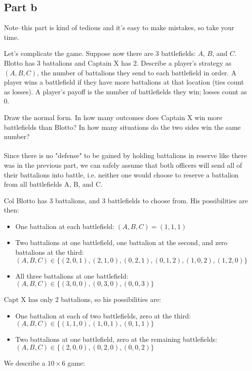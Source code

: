 \documentclass[10pt]{article}
\begin{document}
\subsection*{Part b} Note--this part is kind of tedious and it's easy to make mistakes, so take your time.

Let's complicate the game. Suppose now there are 3 battlefields: $A$, $B$, and $C$. Blotto has 3 battalions and Captain X has 2. Describe a player's strategy as $(A,B,C)$, the number of battalions they send to each battlefield in order. A player wins a battlefield if they have more battalions at that location (ties count as losses). A player's payoff is the number of battlefields they win; losses count as 0.

Draw the normal form. In how many outcomes does Captain X win more battlefields than Blotto? In how many situations do the two sides win the same number? 
\\ \\
Since there is no "defense" to be gained by holding battalions in reserve like there was in the previous part, we can safely assume that both officers will send all of their battalions into battle, i.e. neither one would choose to reserve a battalion from all battlefields A, B, and C.

Col Blotto has 3 battalions, and 3 battlefields to choose from. His possibilities are then:
\begin{itemize}
	\item One battalion at each battlefield: $(A, B, C) = (1, 1, 1)$
	\item Two battalions at one battlefield, one battalion at the second, and zero battalions at the third: $(A, B, C) \in \{(2, 0, 1), (2, 1, 0), (0, 2, 1), (0, 1, 2), (1, 0, 2), (1, 2, 0)\}$
	\item All three battalions at one battlefield: $(A, B, C) \in \{(3, 0, 0), (0, 3, 0), (0, 0, 3)\}$
\end{itemize}

Capt X has only 2 battalions, so his possibilities are:
\begin{itemize}
	\item One battalion at each of two battlefields, zero at the third: $(A, B, C) \in \{(1, 1, 0), (1, 0, 1), (0, 1, 1)\}$
	\item Two battalions at one battlefield, zero at the remaining battlefields: $(A, B, C) \in \{(2, 0, 0), (0, 2, 0), (0, 0, 2)\}$
\end{itemize}
We describe a $10 \times 6$ game:
\end{document}
